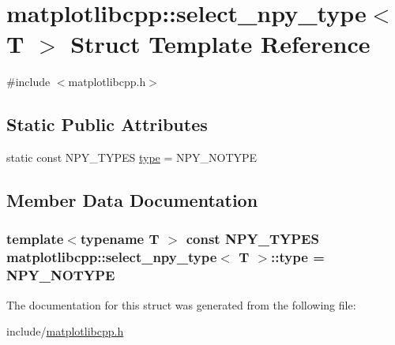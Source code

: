 \hypertarget{structmatplotlibcpp_1_1select__npy__type}{}\section{matplotlibcpp\+:\+:select\+\_\+npy\+\_\+type$<$ T $>$ Struct Template Reference}
\label{structmatplotlibcpp_1_1select__npy__type}


{\ttfamily \#include $<$matplotlibcpp.\+h$>$}

\subsection*{Static Public Attributes}
\begin{DoxyCompactItemize}
\item 
static const N\+P\+Y\+\_\+\+T\+Y\+P\+ES \hyperlink{structmatplotlibcpp_1_1select__npy__type_acbffa4e6e1d047b52e12330446816c9c}{type} = N\+P\+Y\+\_\+\+N\+O\+T\+Y\+PE
\end{DoxyCompactItemize}


\subsection{Member Data Documentation}
\subsubsection[{\texorpdfstring{type}{type}}]{\setlength{\rightskip}{0pt plus 5cm}template$<$typename T $>$ const N\+P\+Y\+\_\+\+T\+Y\+P\+ES {\bf matplotlibcpp\+::select\+\_\+npy\+\_\+type}$<$ T $>$\+::type = N\+P\+Y\+\_\+\+N\+O\+T\+Y\+PE\hspace{0.3cm}{\ttfamily [static]}}\hypertarget{structmatplotlibcpp_1_1select__npy__type_acbffa4e6e1d047b52e12330446816c9c}{}\label{structmatplotlibcpp_1_1select__npy__type_acbffa4e6e1d047b52e12330446816c9c}


The documentation for this struct was generated from the following file\+:\begin{DoxyCompactItemize}
\item 
include/\hyperlink{matplotlibcpp_8h}{matplotlibcpp.\+h}\end{DoxyCompactItemize}

